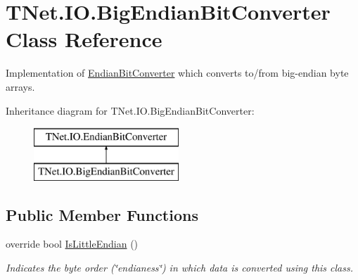 \hypertarget{class_t_net_1_1_i_o_1_1_big_endian_bit_converter}{}\section{T\+Net.\+I\+O.\+Big\+Endian\+Bit\+Converter Class Reference}
\label{class_t_net_1_1_i_o_1_1_big_endian_bit_converter}


Implementation of \mbox{\hyperlink{class_t_net_1_1_i_o_1_1_endian_bit_converter}{Endian\+Bit\+Converter}} which converts to/from big-\/endian byte arrays.  


Inheritance diagram for T\+Net.\+I\+O.\+Big\+Endian\+Bit\+Converter\+:\begin{figure}[H]
\begin{center}
\leavevmode
\includegraphics[height=2.000000cm]{class_t_net_1_1_i_o_1_1_big_endian_bit_converter}
\end{center}
\end{figure}
\subsection*{Public Member Functions}
\begin{DoxyCompactItemize}
\item 
override bool \mbox{\hyperlink{class_t_net_1_1_i_o_1_1_big_endian_bit_converter_a277e4b24764d25a882042be3c2e1f231}{Is\+Little\+Endian}} ()
\begin{DoxyCompactList}\small\item\em Indicates the byte order (\char`\"{}endianess\char`\"{}) in which data is converted using this class. \end{DoxyCompactList}\end{DoxyCompactItemize}
